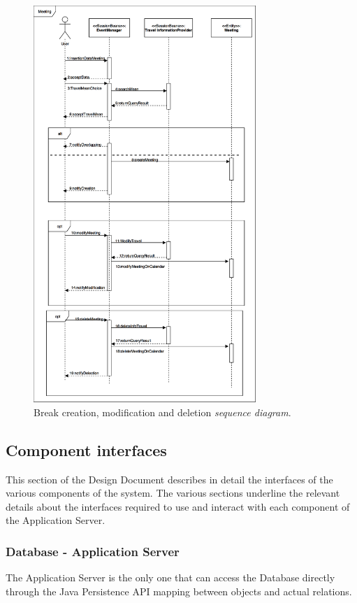 \documentclass{article}
\begin{document}
	\newpage
	\begin{figure}[!ht]
	\centering
	\includegraphics[width=0.75\textwidth]{img/diagrams/sd_break.png}
	\caption{Break creation, modification and deletion \textit{sequence diagram}.}
	\end{figure}


	\newpage
	\subsection{Component interfaces}
	
	This section of the Design Document describes in detail the interfaces of the various components of the system. The various sections underline the relevant details about the interfaces required to use and interact with each component of the Application Server.

	\subsubsection{Database - Application Server}
	The Application Server is the only one that can access the Database directly through the Java Persistence API mapping between objects and actual relations.
\end{document}
